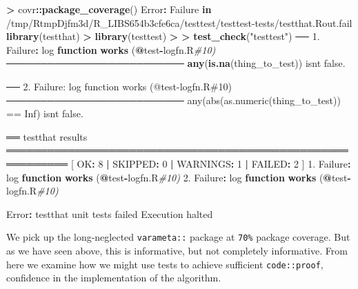 \documentclass[
]{article}
\newenvironment{Shaded}{\begin{snugshade}}{\end{snugshade}}
\newcommand{\CommentTok}[1]{\textcolor[rgb]{0.56,0.35,0.01}{\textit{#1}}}
\newcommand{\ControlFlowTok}[1]{\textcolor[rgb]{0.13,0.29,0.53}{\textbf{#1}}}
\newcommand{\DataTypeTok}[1]{\textcolor[rgb]{0.13,0.29,0.53}{#1}}
\newcommand{\DecValTok}[1]{\textcolor[rgb]{0.00,0.00,0.81}{#1}}
\newcommand{\ErrorTok}[1]{\textcolor[rgb]{0.64,0.00,0.00}{\textbf{#1}}}
\newcommand{\FloatTok}[1]{\textcolor[rgb]{0.00,0.00,0.81}{#1}}
\newcommand{\KeywordTok}[1]{\textcolor[rgb]{0.13,0.29,0.53}{\textbf{#1}}}
\newcommand{\NormalTok}[1]{#1}
\newcommand{\OperatorTok}[1]{\textcolor[rgb]{0.81,0.36,0.00}{\textbf{#1}}}
\newcommand{\StringTok}[1]{\textcolor[rgb]{0.31,0.60,0.02}{#1}}
\begin{document}
\begin{Shaded}
\begin{Highlighting}[]
\OperatorTok{>}\StringTok{ }\NormalTok{covr}\OperatorTok{::}\KeywordTok{package\_coverage}\NormalTok{()}
\NormalTok{Error}\OperatorTok{:}\StringTok{ }\NormalTok{Failure }\ControlFlowTok{in} \StringTok{\textasciigrave{}}\DataTypeTok{/tmp/RtmpDjfm3d/R\_LIBS654b3cfe6ca/testtest/testtest{-}tests/testthat.Rout.fail}\StringTok{\textasciigrave{}}
\KeywordTok{library}\NormalTok{(testthat)}
\OperatorTok{>}\StringTok{ }\KeywordTok{library}\NormalTok{(testtest)}
\OperatorTok{>}\StringTok{ }
\ErrorTok{>}\StringTok{ }\KeywordTok{test\_check}\NormalTok{(}\StringTok{"testtest"}\NormalTok{)}
\NormalTok{── }\FloatTok{1.}\NormalTok{ Failure}\OperatorTok{:}\StringTok{ }\NormalTok{log }\ControlFlowTok{function} \KeywordTok{works}\NormalTok{ (}\OperatorTok{@}\NormalTok{test}\OperatorTok{{-}}\NormalTok{logfn.R}\CommentTok{\#10)  ──────────────────────────}
\KeywordTok{any}\NormalTok{(}\KeywordTok{is.na}\NormalTok{(thing\_to\_test)) isn}\StringTok{\textquotesingle{}t false.}

\StringTok{── 2. Failure: log function works (@test{-}logfn.R\#10)  ──────────────────────────}
\StringTok{any(abs(as.numeric(thing\_to\_test)) == Inf) isn\textquotesingle{}}\NormalTok{t false.}

\NormalTok{══ testthat results  ═══════════════════════════════════════════════════════════}
\NormalTok{[ OK}\OperatorTok{:}\StringTok{ }\DecValTok{8} \OperatorTok{|}\StringTok{ }\NormalTok{SKIPPED}\OperatorTok{:}\StringTok{ }\DecValTok{0} \OperatorTok{|}\StringTok{ }\NormalTok{WARNINGS}\OperatorTok{:}\StringTok{ }\DecValTok{1} \OperatorTok{|}\StringTok{ }\NormalTok{FAILED}\OperatorTok{:}\StringTok{ }\DecValTok{2}\NormalTok{ ]}
\FloatTok{1.}\NormalTok{ Failure}\OperatorTok{:}\StringTok{ }\NormalTok{log }\ControlFlowTok{function} \KeywordTok{works}\NormalTok{ (}\OperatorTok{@}\NormalTok{test}\OperatorTok{{-}}\NormalTok{logfn.R}\CommentTok{\#10) }
\FloatTok{2.}\NormalTok{ Failure}\OperatorTok{:}\StringTok{ }\NormalTok{log }\ControlFlowTok{function} \KeywordTok{works}\NormalTok{ (}\OperatorTok{@}\NormalTok{test}\OperatorTok{{-}}\NormalTok{logfn.R}\CommentTok{\#10) }

\NormalTok{Error}\OperatorTok{:}\StringTok{ }\NormalTok{testthat unit tests failed}
\NormalTok{Execution halted}
\end{Highlighting}
\end{Shaded}

We pick up the long-neglected \texttt{varameta::} package at
\texttt{70\%} package coverage. But as we have seen above, this is
informative, but not completely informative. From here we examine how we
might use tests to achieve sufficient \texttt{code::proof}, confidence
in the implementation of the algorithm.
\end{document}
